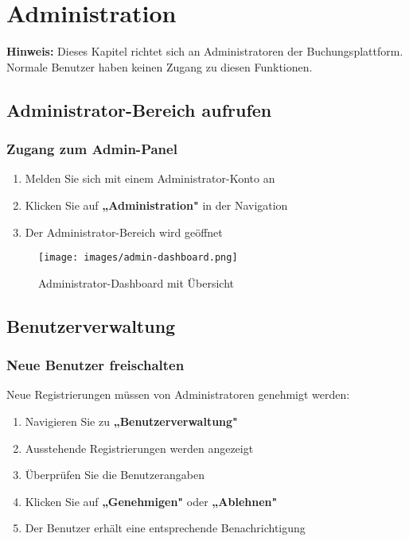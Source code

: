 \section{Administration}
\label{sec:administration}

\textbf{Hinweis:} Dieses Kapitel richtet sich an Administratoren der Buchungsplattform. Normale Benutzer haben keinen Zugang zu diesen Funktionen.

\subsection{Administrator-Bereich aufrufen}

\subsubsection{Zugang zum Admin-Panel}

\begin{enumerate}
    \item Melden Sie sich mit einem Administrator-Konto an
    \item Klicken Sie auf \textbf{„Administration"} in der Navigation
    \item Der Administrator-Bereich wird geöffnet
\end{enumerate}

\begin{figure}[H]
    \centering
    \texttt{[image: images/admin-dashboard.png]}
    \caption{Administrator-Dashboard mit Übersicht}
    \label{fig:admin-dashboard}
\end{figure}

\subsection{Benutzerverwaltung}

\subsubsection{Neue Benutzer freischalten}

Neue Registrierungen müssen von Administratoren genehmigt werden:

\begin{enumerate}
    \item Navigieren Sie zu \textbf{„Benutzerverwaltung"}
    \item Ausstehende Registrierungen werden angezeigt
    \item Überprüfen Sie die Benutzerangaben
    \item Klicken Sie auf \textbf{„Genehmigen"} oder \textbf{„Ablehnen"}
    \item Der Benutzer erhält eine entsprechende Benachrichtigung
\end{enumerate}

